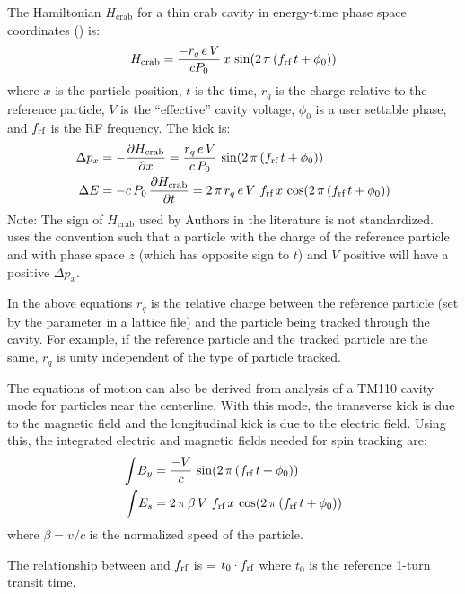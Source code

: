 The Hamiltonian $H_{\text{crab}}$ for a thin crab cavity in energy-time phase space coordinates
() is\cite{b:crab1}:
\begin{equation}
  H_{\text{crab}} = \frac{-r_q \, e \, V}{c P_0} \, x \, \sin(2 \, \pi \, (f_{\text{rf}} \, t + \phi_0))
\end{equation}
where $x$ is the particle position, $t$ is the time, $r_q$ is the charge relative to the reference
particle, $V$ is the ``effective'' cavity voltage, $\phi_0$ is a user settable
phase, and $f_{\text{rf}}$ is the RF frequency. The kick is:
\begin{align} 
  \Delta p_x &= - \frac{\partial H_{\text{crab}}}{\partial x} = 
    \frac{r_q \, e \, V}{c \, P_0} \, \sin(2 \, \pi \, (f_{\text{rf}} \, t + \phi_0)) \nonumber \\ 
  \Delta E &= -c \, P_0 \, \frac{\partial H_{\text{crab}}}{\partial t} = 
    2 \, \pi \, r_q \, e \, V \, \, f_{\text{rf}} \, x \, \cos(2 \, \pi \, (f_{\text{rf}} \, t + \phi_0)) 
\end{align} 
Note: The sign of $H_{\text{crab}}$ used by Authors in the literature is not standardized. \bmad
uses the convention such that a particle with the charge of the reference particle and with phase
space $z$ (which has opposite sign to $t$) and $V$ positive will have a positive $\Delta p_x$.

In the above equations $r_q$ is the relative charge between the reference particle (set by the
 parameter in a lattice file) and the particle being tracked through the
cavity. For example, if the reference particle and the tracked particle are the same, $r_q$ is
unity independent of the type of particle tracked.

The equations of motion can also be derived from analysis of a TM110 cavity mode for particles near
the centerline\cite{b:kim}. With this mode, the transverse kick is due to the magnetic field and the
longitudinal kick is due to the electric field. Using this, the integrated electric and magnetic
fields needed for spin tracking are:
\begin{align}
  \int \! B_y &= \frac{-V}{c} \, \sin(2 \, \pi \, (f_{\text{rf}} \, t + \phi_0)) \nonumber \\ 
  \int \! E_s &= 2 \, \pi \, \beta \, V \, \, f_{\text{rf}} \, x \, \cos(2 \, \pi \, (f_{\text{rf}} \, t + \phi_0))
\end{align}
where $\beta = v/c$ is the normalized speed of the particle.

The relationship between  and $f_{\text{rf}}$ is 
 = $t_0 \cdot f_{\text{rf}}$ where $t_0$ is the reference 1-turn transit time.

